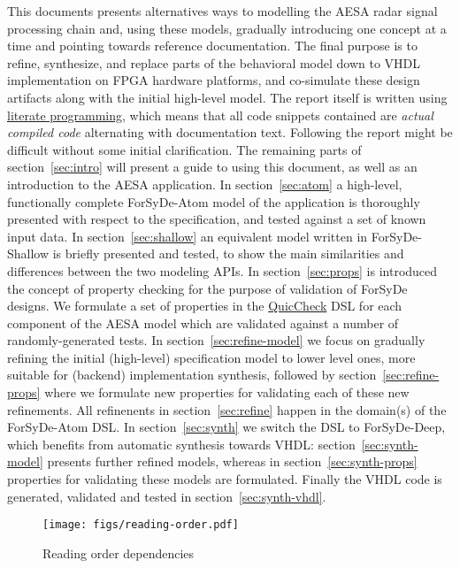 \documentclass[
  a4paper,
]{article}
\begin{document}
This documents presents alternatives ways to modelling the AESA radar
signal processing chain and, using these models, gradually introducing
one concept at a time and pointing towards reference documentation. The
final purpose is to refine, synthesize, and replace parts of the
behavioral model down to VHDL implementation on FPGA hardware platforms,
and co-simulate these design artifacts along with the initial high-level
model. The report itself is written using
\href{https://en.wikipedia.org/wiki/Literate_programming}{literate
programming}, which means that all code snippets contained are
\emph{actual compiled code} alternating with documentation text.
Following the report might be difficult without some initial
clarification. The remaining parts of section~\ref{sec:intro} will
present a guide to using this document, as well as an introduction to
the AESA application. In section~\ref{sec:atom} a high-level,
functionally complete ForSyDe-Atom model of the application is
thoroughly presented with respect to the specification, and tested
against a set of known input data. In section~\ref{sec:shallow} an
equivalent model written in ForSyDe-Shallow is briefly presented and
tested, to show the main similarities and differences between the two
modeling APIs. In section~\ref{sec:props} is introduced the concept of
property checking for the purpose of validation of ForSyDe designs. We
formulate a set of properties in the
\href{https://begriffs.com/posts/2017-01-14-design-use-quickcheck.html}{QuicCheck}
DSL for each component of the AESA model which are validated against a
number of randomly-generated tests. In section~\ref{sec:refine-model} we
focus on gradually refining the initial (high-level) specification model
to lower level ones, more suitable for (backend) implementation
synthesis, followed by section~\ref{sec:refine-props} where we formulate
new properties for validating each of these new refinements. All
refinenents in section~\ref{sec:refine} happen in the domain(s) of the
ForSyDe-Atom DSL. In section~\ref{sec:synth} we switch the DSL to
ForSyDe-Deep, which benefits from automatic synthesis towards VHDL:
section~\ref{sec:synth-model} presents further refined models, whereas
in section~\ref{sec:synth-props} properties for validating these models
are formulated. Finally the VHDL code is generated, validated and tested
in section~\ref{sec:synth-vhdl}.

\begin{figure}
\hypertarget{fig:reading-order}{%
\centering
\texttt{[image: figs/reading-order.pdf]}
\caption{Reading order dependencies}\label{fig:reading-order}
}
\end{figure}
\end{document}
